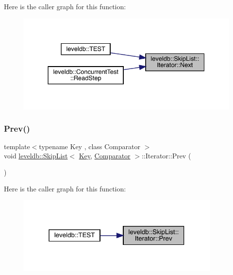 Here is the caller graph for this function\+:
\nopagebreak
\begin{figure}[H]
\begin{center}
\leavevmode
\includegraphics[width=331pt]{classleveldb_1_1_skip_list_1_1_iterator_ade5a684c74056f578f85237735da0cef_icgraph}
\end{center}
\end{figure}
\mbox{\label{classleveldb_1_1_skip_list_1_1_iterator_a10dbaf45640ab2b9f61a96c82e7227e5}} 
\subsubsection{\texorpdfstring{Prev()}{Prev()}}
{\footnotesize\ttfamily template$<$typename Key , class Comparator $>$ \\
void \mbox{\hyperlink{classleveldb_1_1_skip_list}{leveldb\+::\+Skip\+List}}$<$ \mbox{\hyperlink{namespaceleveldb_a7e9a9725b13fa0bd922d885280dfab95}{Key}}, \mbox{\hyperlink{structleveldb_1_1_comparator}{Comparator}} $>$\+::Iterator\+::\+Prev (\begin{DoxyParamCaption}{ }\end{DoxyParamCaption})\hspace{0.3cm}{\ttfamily [inline]}}

Here is the caller graph for this function\+:
\nopagebreak
\begin{figure}[H]
\begin{center}
\leavevmode
\includegraphics[width=289pt]{classleveldb_1_1_skip_list_1_1_iterator_a10dbaf45640ab2b9f61a96c82e7227e5_icgraph}
\end{center}
\end{figure}
\mbox{\label{classleveldb_1_1_skip_list_1_1_iterator_a6c641d5cd37386abdb0aa8d73454611a}} 
